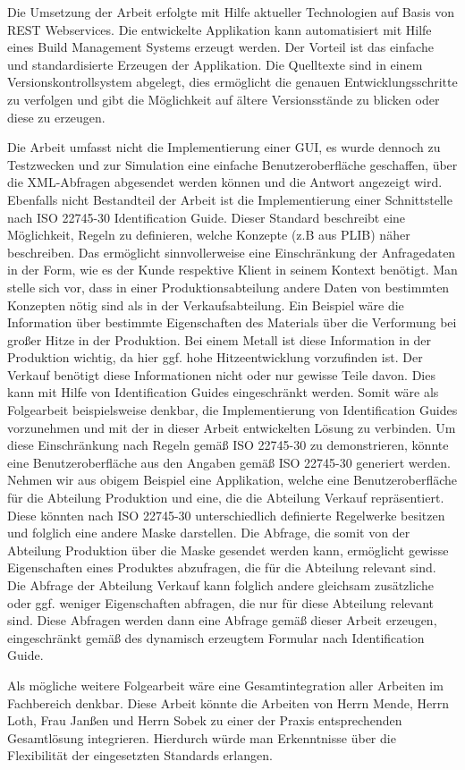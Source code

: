 Die Umsetzung der Arbeit erfolgte mit Hilfe aktueller Technologien auf Basis von \gls{REST} \glspl{Webservice}. Die entwickelte Applikation kann automatisiert mit Hilfe eines Build Management Systems erzeugt werden. Der Vorteil ist das einfache und standardisierte Erzeugen der Applikation. Die Quelltexte sind in einem Versionskontrollsystem abgelegt, dies ermöglicht die genauen Entwicklungsschritte zu verfolgen und gibt die Möglichkeit auf ältere Versionsstände zu blicken oder diese zu erzeugen. 

Die Arbeit umfasst nicht die Implementierung einer GUI, es wurde dennoch zu Testzwecken und zur Simulation eine einfache Benutzeroberfläche geschaffen, über die XML-Abfragen abgesendet werden können und die Antwort angezeigt wird. Ebenfalls nicht Bestandteil der Arbeit ist die Implementierung einer Schnittstelle nach ISO 22745-30 Identification Guide. Dieser Standard beschreibt eine Möglichkeit, Regeln zu definieren, welche Konzepte (z.B aus \gls{PLIB}) näher beschreiben. Das ermöglicht sinnvollerweise eine Einschränkung der Anfragedaten in der Form, wie es der Kunde respektive Klient in seinem Kontext benötigt. Man stelle sich vor, dass in einer Produktionsabteilung andere Daten von bestimmten Konzepten nötig sind als in der Verkaufsabteilung. Ein Beispiel wäre die Information über bestimmte Eigenschaften des Materials über die Verformung bei großer Hitze in der Produktion. Bei einem Metall ist diese Information in der Produktion wichtig, da hier ggf. hohe Hitzeentwicklung vorzufinden ist. Der Verkauf benötigt diese Informationen nicht oder nur gewisse Teile davon. Dies kann mit Hilfe von Identification Guides eingeschränkt werden. 
Somit wäre als Folgearbeit beispielsweise denkbar, die Implementierung von Identification Guides vorzunehmen und mit der in dieser Arbeit entwickelten Lösung zu verbinden. Um diese Einschränkung nach Regeln gemäß ISO 22745-30 zu demonstrieren, könnte eine Benutzeroberfläche aus den Angaben gemäß ISO 22745-30 generiert werden. Nehmen wir aus obigem Beispiel eine Applikation, welche eine Benutzeroberfläche für die Abteilung Produktion und eine, die die Abteilung Verkauf repräsentiert. Diese könnten nach ISO 22745-30 unterschiedlich definierte Regelwerke besitzen und folglich eine andere Maske darstellen. Die Abfrage, die somit von der Abteilung Produktion über die Maske gesendet werden kann, ermöglicht gewisse Eigenschaften eines Produktes abzufragen, die für die Abteilung relevant sind. Die Abfrage der Abteilung Verkauf kann folglich andere gleichsam zusätzliche oder ggf. weniger Eigenschaften abfragen, die nur für diese Abteilung relevant sind. Diese Abfragen werden dann eine Abfrage gemäß dieser Arbeit erzeugen, eingeschränkt gemäß des dynamisch erzeugtem Formular nach Identification Guide. 

Als mögliche weitere Folgearbeit wäre eine Gesamtintegration aller Arbeiten im Fachbereich denkbar. Diese Arbeit könnte die Arbeiten von Herrn Mende, Herrn Loth, Frau Janßen und Herrn Sobek zu einer der Praxis entsprechenden Gesamtlösung integrieren. Hierdurch würde man Erkenntnisse über die Flexibilität der eingesetzten Standards erlangen.  
